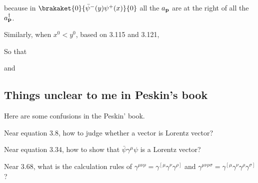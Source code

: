 because in $\brakaket{0}{\bar{\psi}^-(y)\psi^+(x)}{0}$ all the $a_\bf{p}$ are at the right of all the $a^\dagger_\bf{p}$.

Similarly, when $x^0<y^0$, based on 3.115 and 3.121,


So that


and 


\subsection{Things unclear to me in Peskin's book}

Here are some confusions in the Peskin' book. 

Near equation 3.8, how to judge whether a vector is Lorentz vector? 

Near equation 3.34, how to show that $\bar{\psi}\gamma^\mu\psi$ is a Lorentz vector? 

Near 3.68, what is the calculation rules of $\gamma^{\mu\nu\rho}=\gamma^{\left[\mu\right.}\gamma^\nu\gamma^{\left.\rho\right]}$ and $\gamma^{\mu\nu\rho\sigma}=\gamma^{\left[\mu\right.}\gamma^\nu\gamma^\rho\gamma^{\left.\sigma\right]}$?
